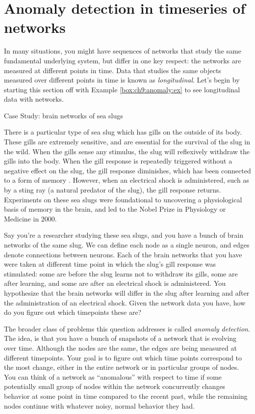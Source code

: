 \section{Anomaly detection in timeseries of networks}
\label{sec:ch9:anomaly}

In many situations, you might have sequences of networks that study the same fundamental underlying system, but differ in one key respect: the networks are measured at different points in time. Data that studies the same objects measured over different points in time is known as \textit{longitudinal}. Let's begin by starting this section off with Example \ref{box:ch9:anomaly:ex} to see longitudinal data with networks.

\begin{floatingbox}[h]\caption{Case Study: brain networks of sea slugs}
\label{box:ch9:anomaly:ex}
There is a particular type of sea slug which has gills on the outside of its body. These gills are extremely sensitive, and are essential for the survival of the slug in the wild. When the gills sense any stimulus, the slug will reflexively withdraw the gills into the body. When the gill response is repeatedly triggered without a negative effect on the slug, the gill response diminishes, which has been connected to a form of memory \cite{Carew1971Aug,Kandel2001Nov}. However, when an electrical shock is administered, such as by a sting ray (a natural predator of the slug), the gill response returns. Experiments on these sea slugs were foundational to uncovering a physiological basis of memory in the brain, and led to the Nobel Prize in Physiology or Medicine in $2000$.

Say you’re a researcher studying these sea slugs, and you have a bunch of brain networks of the same slug. We can define each node as a single neuron, and edges denote connections between neurons. Each of the brain networks that you have were taken at different time point in which the slug's gill response was stimulated: some are before the slug learns not to withdraw its gills, some are after learning, and some are after an electrical shock is administered. You hypothesize that the brain networks will differ in the slug after learning and after the administration of an electrical shock. Given the network data you have, how do you figure out which timepoints these are?
\end{floatingbox}

The broader class of problems this question addresses is called \textit{anomaly detection}. The idea, is that you have a bunch of snapshots of a network that is evolving over time. Although the nodes are the same, the edges are being measured at different timepoints. Your goal is to figure out which time points correspond to the most change, either in the entire network or in particular groups of nodes. You can think of a network as ``anomalous'' with respect to time if some potentially small group of nodes within the network concurrently changes behavior at some point in time compared to the recent past, while the remaining nodes continue with whatever noisy, normal behavior they had.

